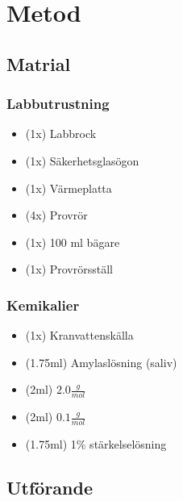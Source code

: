 \documentclass[a4paper,12pt]{article}
\begin{document}
\section{Metod}

\subsection{Matrial}

\subsubsection{Labbutrustning}

	\begin{itemize}
		\item (1x) Labbrock 						
		\item (1x) Säkerhetsglasögon			
		\item (1x) Värmeplatta 					
		\item (4x) Provrör						
		\item (1x) 100 ml bägare					
		\item (1x) Provrörsställ
	\end{itemize}

\subsubsection{Kemikalier}

	\begin{itemize}
		\item (1x) Kranvattenskälla
		\item (1.75ml) Amylaslösning (saliv)
		\item (2ml) $2.0\frac{g}{mol}$  
		\item (2ml) $0.1\frac{g}{mol}$ 	
		\item (1.75ml) 1\% stärkelselösning			
	\end{itemize}

\subsection{Utförande}
\end{document}
